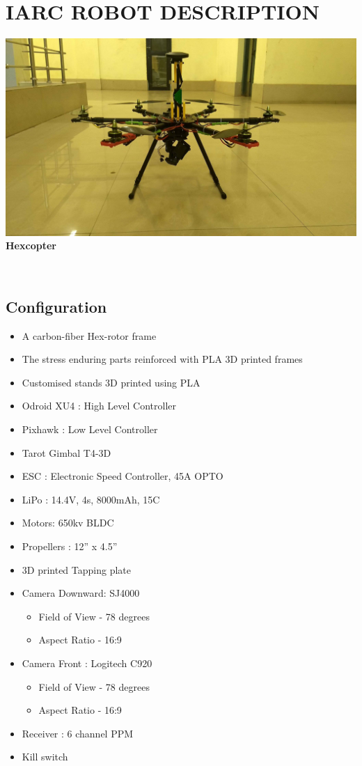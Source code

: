 \documentclass[12pt]{article}
\begin{document}
\section{IARC ROBOT DESCRIPTION}
\begin{center}\includegraphics[scale=0.15]{hex} \\
\textbf{Hexcopter}\end{center}\\
\subsection{Configuration}
\begin{itemize}
	\item A carbon-fiber Hex-rotor frame
	\item The stress enduring parts reinforced with PLA 3D printed frames
	\item Customised stands 3D printed using PLA
    \item Odroid XU4 : High Level Controller
    \item Pixhawk : Low Level Controller
    \item Tarot Gimbal T4-3D
    \item ESC     : Electronic Speed Controller, 45A OPTO
    \item LiPo : 14.4V, 4s, 8000mAh, 15C
    \item Motors: 650kv BLDC
    \item Propellers : 12” x 4.5”
    \item 3D printed Tapping plate
    \item Camera Downward: SJ4000
    \begin{itemize}
    	\item Field of View - 78 degrees
    	\item Aspect Ratio - 16:9
    \end{itemize}
    \item Camera Front : Logitech C920
    \begin{itemize}
    	\item Field of View - 78 degrees
    	\item Aspect Ratio - 16:9
    \end{itemize}	
    \item Receiver : 6 channel PPM
    \item Kill switch 
\end{itemize}
\end{document}
